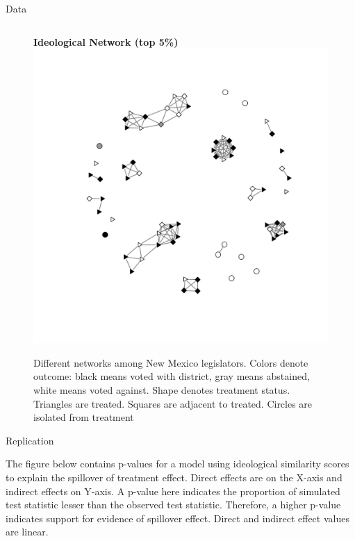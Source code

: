 \documentclass[final]{beamer}
\newlength{\onecolwid}
\newlength{\onecolwidd}
\begin{document}
\begin{frame}[t]
\begin{columns}[t]
\begin{column}{\onecolwidd}
\begin{block}{Data}
\begin{rmfamily}
\begin{figure}
\begin{tabular}{cc}
	\end{tabular}
	{\bf Ideological Network (top 5\%)} \\
	\includegraphics[scale=0.9, clip=true,trim =2cm 2cm 2cm 2cm]{coppock_ideological_net.pdf}
	\caption{Different networks among New Mexico legislators. Colors denote outcome: black means voted with district, gray means abstained, white means voted against. Shape denotes treatment status. Triangles are treated. Squares are adjacent to treated. Circles are isolated from treatment}
	\label{fig:nh-nets}
	\end{figure}

	\end{rmfamily}						
	\end{block}
	

	\begin{block}{Replication}
	\begin{rmfamily}
	
	The figure below contains p-values for a model using ideological similarity scores to explain the spillover of treatment effect. Direct effects are on the X-axis and indirect effects on Y-axis. A p-value here indicates the proportion of simulated test statistic lesser than the observed test statistic. Therefore, a higher p-value indicates support for evidence of spillover effect. Direct and indirect effect values are linear.



\end{rmfamily}
\end{block}
\end{column}
\end{columns}
\end{frame}
\end{document}
